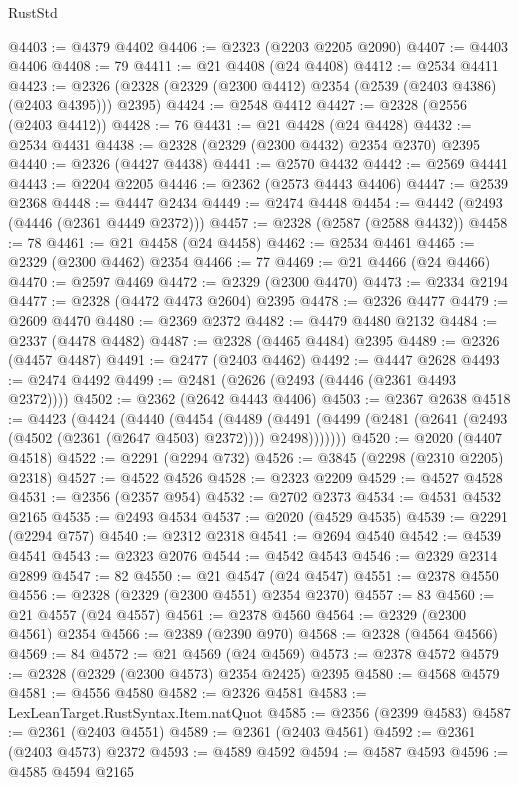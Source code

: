 \begin{lexlean}{RustStd}
\begin{coremodule}
@4403 := @4379 @4402
@4406 := @2323 (@2203 @2205 @2090)
@4407 := @4403 @4406
@4408 := 79
@4411 := @21 @4408 (@24 @4408)
@4412 := @2534 @4411
@4423 := @2326 (@2328 (@2329 (@2300 @4412) @2354 (@2539 (@2403 @4386) (@2403 @4395))) @2395)
@4424 := @2548 @4412
@4427 := @2328 (@2556 (@2403 @4412))
@4428 := 76
@4431 := @21 @4428 (@24 @4428)
@4432 := @2534 @4431
@4438 := @2328 (@2329 (@2300 @4432) @2354 @2370) @2395
@4440 := @2326 (@4427 @4438)
@4441 := @2570 @4432
@4442 := @2569 @4441
@4443 := @2204 @2205
@4446 := @2362 (@2573 @4443 @4406)
@4447 := @2539 @2368
@4448 := @4447 @2434
@4449 := @2474 @4448
@4454 := @4442 (@2493 (@4446 (@2361 @4449 @2372)))
@4457 := @2328 (@2587 (@2588 @4432))
@4458 := 78
@4461 := @21 @4458 (@24 @4458)
@4462 := @2534 @4461
@4465 := @2329 (@2300 @4462) @2354
@4466 := 77
@4469 := @21 @4466 (@24 @4466)
@4470 := @2597 @4469
@4472 := @2329 (@2300 @4470)
@4473 := @2334 @2194
@4477 := @2328 (@4472 @4473 @2604) @2395
@4478 := @2326 @4477
@4479 := @2609 @4470
@4480 := @2369 @2372
@4482 := @4479 @4480 @2132
@4484 := @2337 (@4478 @4482)
@4487 := @2328 (@4465 @4484) @2395
@4489 := @2326 (@4457 @4487)
@4491 := @2477 (@2403 @4462)
@4492 := @4447 @2628
@4493 := @2474 @4492
@4499 := @2481 (@2626 (@2493 (@4446 (@2361 @4493 @2372))))
@4502 := @2362 (@2642 @4443 @4406)
@4503 := @2367 @2638
@4518 := @4423
    (@4424
      (@4440
        (@4454
          (@4489
            (@4491 (@4499 (@2481 (@2641 (@2493 (@4502 (@2361 (@2647 @4503) @2372)))) @2498)))))))
@4520 := @2020 (@4407 @4518)
@4522 := @2291 (@2294 @732)
@4526 := @3845 (@2298 (@2310 @2205) @2318)
@4527 := @4522 @4526
@4528 := @2323 @2209
@4529 := @4527 @4528
@4531 := @2356 (@2357 @954)
@4532 := @2702 @2373
@4534 := @4531 @4532 @2165
@4535 := @2493 @4534
@4537 := @2020 (@4529 @4535)
@4539 := @2291 (@2294 @757)
@4540 := @2312 @2318
@4541 := @2694 @4540
@4542 := @4539 @4541
@4543 := @2323 @2076
@4544 := @4542 @4543
@4546 := @2329 @2314 @2899
@4547 := 82
@4550 := @21 @4547 (@24 @4547)
@4551 := @2378 @4550
@4556 := @2328 (@2329 (@2300 @4551) @2354 @2370)
@4557 := 83
@4560 := @21 @4557 (@24 @4557)
@4561 := @2378 @4560
@4564 := @2329 (@2300 @4561) @2354
@4566 := @2389 (@2390 @970)
@4568 := @2328 (@4564 @4566)
@4569 := 84
@4572 := @21 @4569 (@24 @4569)
@4573 := @2378 @4572
@4579 := @2328 (@2329 (@2300 @4573) @2354 @2425) @2395
@4580 := @4568 @4579
@4581 := @4556 @4580
@4582 := @2326 @4581
@4583 := LexLeanTarget.RustSyntax.Item.natQuot
@4585 := @2356 (@2399 @4583)
@4587 := @2361 (@2403 @4551)
@4589 := @2361 (@2403 @4561)
@4592 := @2361 (@2403 @4573) @2372
@4593 := @4589 @4592
@4594 := @4587 @4593
@4596 := @4585 @4594 @2165

\end{coremodule}
\end{lexlean}
